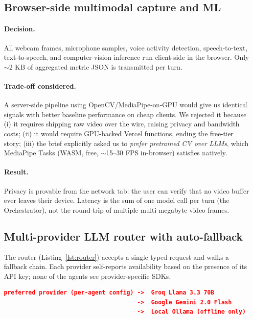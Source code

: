 \documentclass[11pt,a4paper]{article}
\begin{document}
\subsection{Browser-side multimodal capture and ML}

\paragraph{Decision.} All webcam frames, microphone samples, voice activity
detection, speech-to-text, text-to-speech, and computer-vision inference
run client-side in the browser. Only $\sim$2 KB of aggregated metric
JSON is transmitted per turn.

\paragraph{Trade-off considered.}
A server-side pipeline using OpenCV/MediaPipe-on-GPU would give us identical
signals with better baseline performance on cheap clients. We rejected it
because (i) it requires shipping raw video over the wire, raising privacy
and bandwidth costs; (ii) it would require GPU-backed Vercel functions,
ending the free-tier story; (iii) the brief explicitly asked us to
\emph{prefer pretrained CV over LLMs}, which MediaPipe Tasks (WASM,
free, $\sim$15--30 FPS in-browser) satisfies natively.

\paragraph{Result.} Privacy is provable from the network tab: the user can
verify that no video buffer ever leaves their device. Latency is the
sum of one model call per turn (the Orchestrator), not the round-trip
of multiple multi-megabyte video frames.

\subsection{Multi-provider LLM router with auto-fallback}

The router (Listing~\ref{lst:router}) accepts a single typed request and
walks a fallback chain. Each provider self-reports availability based
on the presence of its API key; none of the agents see provider-specific
SDKs.

\begin{lstlisting}[language=json,caption={Router fallback order.},label={lst:router}]
preferred provider (per-agent config) ->  Groq Llama 3.3 70B
                                      ->  Google Gemini 2.0 Flash
                                      ->  Local Ollama (offline only)
\end{lstlisting}
\end{document}
